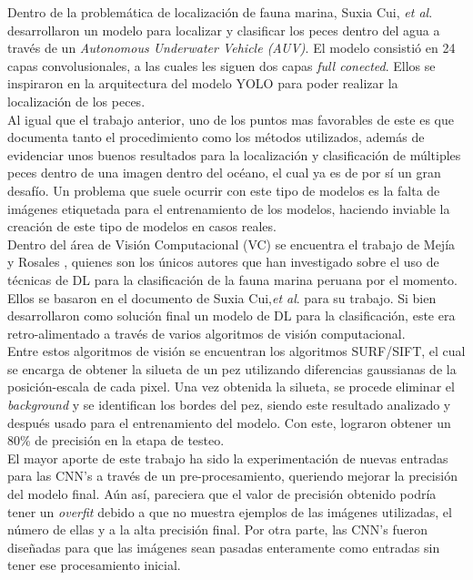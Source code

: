 Dentro de la problemática de localización de fauna marina, Suxia Cui, \textit{et al}. \cite{Cui2020} 
desarrollaron un modelo para localizar y clasificar los peces dentro del agua a través de un 
\textit{Autonomous Underwater Vehicle (AUV)}. El modelo consistió en 24 capas convolusionales, a las 
cuales les siguen dos capas \textit{full conected}. Ellos se inspiraron en la arquitectura del modelo 
YOLO para poder realizar la localización de los peces.\\

Al igual que el trabajo anterior, uno de los puntos mas favorables de este es que documenta tanto el 
procedimiento como los métodos utilizados, además de evidenciar unos buenos resultados para la localización 
y clasificación de múltiples peces dentro de una imagen dentro del océano, el cual ya es de por sí un gran 
desafío. Un problema que suele ocurrir con este tipo de modelos es la falta de imágenes etiquetada para el 
entrenamiento de los modelos, haciendo inviable la creación de este tipo de modelos en casos reales.\\

Dentro del área de Visión Computacional (VC) se encuentra el trabajo de Mejía y Rosales 
\cite{20.500.12724/11174}, quienes son los únicos autores que han investigado sobre el uso 
de técnicas de DL para la clasificación de la fauna marina peruana por el momento. Ellos se 
basaron en el documento de Suxia Cui,\textit{et al}. para su trabajo. Si bien desarrollaron como 
solución final un modelo de DL para la clasificación, este era retro-alimentado a través de 
varios algoritmos de visión computacional.\\

Entre estos algoritmos de visión se encuentran los algoritmos SURF/SIFT, el cual se encarga de obtener la 
silueta de un pez utilizando diferencias gaussianas de la posición-escala de cada pixel. Una vez obtenida 
la silueta, se procede eliminar el \textit{background} y se identifican los bordes del pez, siendo este 
resultado analizado y después usado para el entrenamiento del modelo. Con este, lograron obtener un 80\% 
de precisión en la etapa de testeo.\\

El mayor aporte de este trabajo ha sido la experimentación de nuevas entradas para las CNN's a través de un 
pre-procesamiento, queriendo mejorar la precisión del modelo final. Aún así, pareciera que el valor de precisión 
obtenido podría tener un \textit{overfit} debido a que no muestra ejemplos de las imágenes utilizadas, el número de 
ellas y a la alta precisión final. Por otra parte, las CNN's fueron diseñadas para que las imágenes sean pasadas 
enteramente como entradas sin tener ese procesamiento inicial.\\

